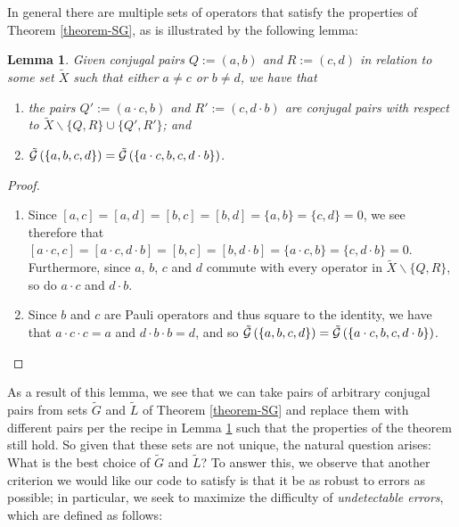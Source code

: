 \documentclass[twocolumn,showpacs,preprintnumbers,amsmath,amssymb,nofootinbib,pra,floatfix]{revtex4-1}
\newtheorem{lemma}{Lemma}
\newcommand{\set}{\tilde}
\newcommand{\genfun}{\tilde{\mathcal{G}}}
\begin{document}
In general there are multiple sets of operators that satisfy the properties of Theorem \ref{theorem-SG}, as is illustrated by the following lemma:

\begin{lemma}
\label{combining-pairs}
Given conjugal pairs $Q:=(a,b)$ and $R:=(c,d)$ in relation to some set $\set X$ such that either $a\ne c$ or $b\ne d$, we have that
\begin{enumerate}
\item the pairs $Q':=(a\cdot c,b)$ and $R':=(c,d\cdot b)$ are conjugal pairs with respect to $\set X \backslash \{Q,R\} \cup \{Q',R'\}$; and
\item $\genfun\paren{\{a,b,c,d\}}=\genfun\paren{\{a\cdot c,b,c,d\cdot b\}}$.
\end{enumerate}
\end{lemma}

\begin{proof}
\begin{enumerate}
\item Since $[a,c]=[a,d]=[b,c]=[b,d]=\{a,b\}=\{c,d\}=0$, we see therefore that $[a\cdot c,c]=[a\cdot c,d\cdot b]=[b,c]=[b,d\cdot b]=\{a\cdot c,b\}=\{c,d\cdot b\}=0$.  Furthermore, since $a$, $b$, $c$ and $d$ commute with every operator in $\set X\backslash \{Q,R\}$, so do $a\cdot c$ and $d\cdot b$.
\item Since $b$ and $c$ are Pauli operators and thus square to the identity, we have that $a\cdot c\cdot c=a$ and $d\cdot b\cdot b=d$, and so $\genfun\paren{\{a,b,c,d\}}=\genfun\paren{\{a\cdot c,b,c,d\cdot b\}}$.
\end{enumerate}
\end{proof}
As a result of this lemma, we see that we can take pairs of arbitrary conjugal pairs from sets $\set G$ and $\set L$ of Theorem \ref{theorem-SG} and replace them with different pairs per the recipe in Lemma \ref{combining-pairs} such that the properties of the theorem still hold.  So given that these sets are not unique, the natural question arises:  What is the best choice of $\set G$ and $\set L$?  To answer this, we observe that another criterion we would like our code to satisfy is that it be as robust to errors as possible;  in particular, we seek to maximize the difficulty of \emph{undetectable errors}, which are defined as follows:
\end{document}
